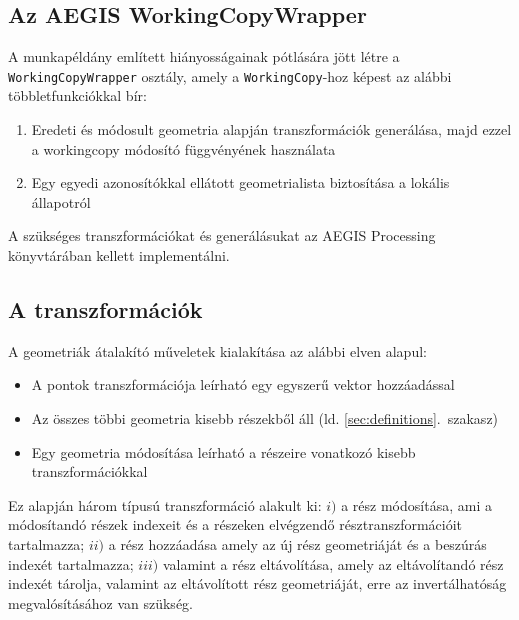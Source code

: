 \subsection{Az AEGIS WorkingCopyWrapper}
A munkapéldány említett hiányosságainak pótlására jött létre a \texttt{WorkingCopyWrapper} osztály, amely a \texttt{WorkingCopy}-hoz képest az alábbi többletfunkciókkal bír:
\begin{enumerate}
	\item Eredeti és módosult geometria alapján transzformációk generálása, majd ezzel a workingcopy módosító függvényének használata
	\item Egy egyedi azonosítókkal ellátott geometrialista biztosítása a lokális állapotról
\end{enumerate}
A szükséges transzformációkat és generálásukat az AEGIS Processing könyvtárában kellett implementálni.
\subsection{A transzformációk}
A geometriák átalakító műveletek kialakítása az alábbi elven alapul:
\begin{itemize}
	\item A pontok transzformációja leírható egy egyszerű vektor hozzáadással
	\item Az összes többi geometria kisebb részekből áll (ld. \ref{sec:definitions}.~szakasz)
	\item Egy geometria módosítása leírható a részeire vonatkozó kisebb transzformációkkal
\end{itemize}
Ez alapján három típusú transzformáció alakult ki: $i)$ a rész módosítása, ami a módosítandó részek indexeit és a részeken elvégzendő résztranszformációit tartalmazza; $ii)$ a rész hozzáadása amely az új rész geometriáját és a beszúrás indexét tartalmazza; $iii)$ valamint a rész eltávolítása, amely az eltávolítandó rész indexét tárolja, valamint az eltávolított rész geometriáját, erre az invertálhatóság megvalósításához van szükség.
